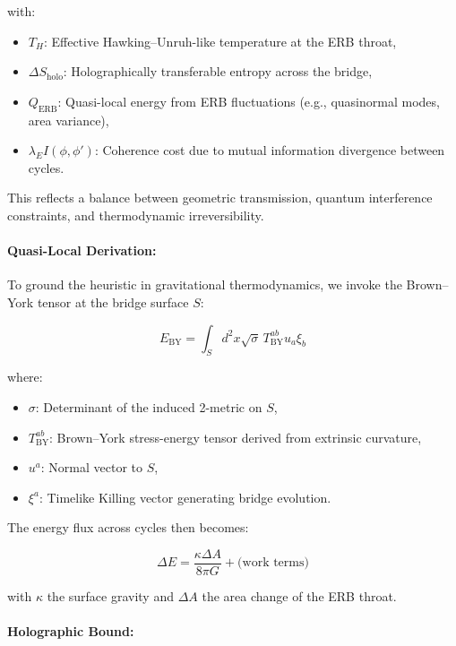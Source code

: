 \noindent
with:
\begin{itemize}
    \item \( T_H \): Effective Hawking–Unruh-like temperature at the ERB throat,
    \item \( \Delta S_{\text{holo}} \): Holographically transferable entropy across the bridge,
    \item \( Q_{\text{ERB}} \): Quasi-local energy from ERB fluctuations (e.g., quasinormal modes, area variance),
    \item \( \lambda_E I(\phi, \phi') \): Coherence cost due to mutual information divergence between cycles.
\end{itemize}

This reflects a balance between geometric transmission, quantum interference constraints, and thermodynamic irreversibility.

\paragraph{Quasi-Local Derivation:}

To ground the heuristic in gravitational thermodynamics, we invoke the Brown–York tensor at the bridge surface \( S \):

\begin{equation}
E_{\text{BY}} = \int_S d^2x \sqrt{\sigma} \, T^{ab}_{\text{BY}} u_a \xi_b
\end{equation}

where:
\begin{itemize}
    \item \( \sigma \): Determinant of the induced 2-metric on \( S \),
    \item \( T^{ab}_{\text{BY}} \): Brown–York stress-energy tensor derived from extrinsic curvature,
    \item \( u^a \): Normal vector to \( S \),
    \item \( \xi^a \): Timelike Killing vector generating bridge evolution.
\end{itemize}

The energy flux across cycles then becomes:

\begin{equation}
\Delta E = \frac{\kappa \Delta A}{8\pi G} + \text{(work terms)}
\end{equation}

with \( \kappa \) the surface gravity and \( \Delta A \) the area change of the ERB throat.

\paragraph{Holographic Bound:}


